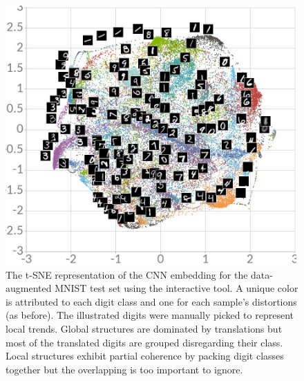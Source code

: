 \documentclass[a4paper,12pt]{report}
\begin{document}
\begin{figure}[t]
    \begin{center}
        \includegraphics[width=\textwidth]{thesis_figures/mnist_da_tsne.jpg}
    \end{center}
    \caption{The t-SNE representation of the CNN embedding for the data-augmented MNIST test set using the interactive tool.
    A unique color is attributed to each digit class and one for each sample's distortions (as before).
    The illustrated digits were manually picked to represent local trends.
    Global structures are dominated by translations but most of the translated digits are grouped disregarding their class.
    Local structures exhibit partial coherence by packing digit classes together but the overlapping is too important to ignore.
    }
    \label{fig:mnist_da_tsne}
\end{figure}
\end{document}
